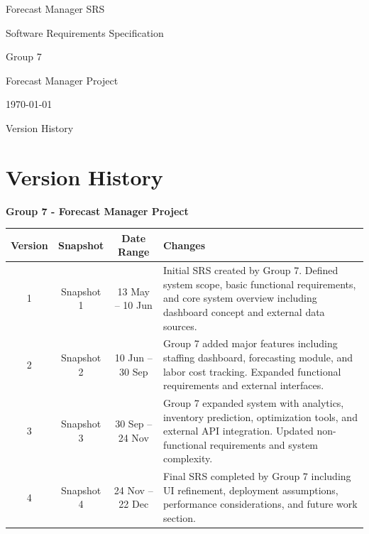 \documentclass[12pt]{report}
\begin{document}
\begin{titlepage}
\centering
\vspace*{1in}

{\Huge Forecast Manager SRS \par}
\vspace{0.5in}

{\Large Software Requirements Specification \par}
\vspace{1in}

{\Large Group 7 \par}
\vspace{0.5in}

{\large Forecast Manager Project \par}
\vfill

{\large \today \par}

\end{titlepage}

Version History 

\section*{Version History}

\textbf{Group 7 - Forecast Manager Project}

\begin{longtable}{|c|c|c|p{8cm}|}
\hline
Version & Snapshot & Date Range & Changes \\ \hline

1 & Snapshot 1 & 13 May – 10 Jun &
Initial SRS created by Group 7. Defined system scope, basic functional requirements, and core system overview including dashboard concept and external data sources. \\ \hline

2 & Snapshot 2 & 10 Jun – 30 Sep &
Group 7 added major features including staffing dashboard, forecasting module, and labor cost tracking. Expanded functional requirements and external interfaces. \\ \hline

3 & Snapshot 3 & 30 Sep – 24 Nov &
Group 7 expanded system with analytics, inventory prediction, optimization tools, and external API integration. Updated non-functional requirements and system complexity. \\ \hline

4 & Snapshot 4 & 24 Nov – 22 Dec &
Final SRS completed by Group 7 including UI refinement, deployment assumptions, performance considerations, and future work section. \\ \hline

\end{longtable}
\end{document}
